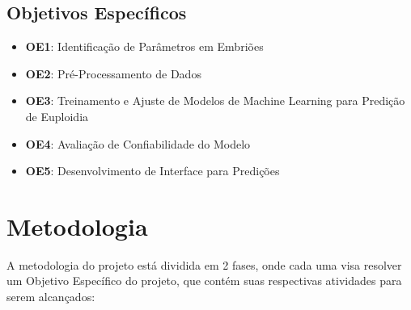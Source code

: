 \subsection{Objetivos Específicos}
\begin{itemize}
    \item \textbf{OE1}: Identificação de Parâmetros em Embriões
    \item \textbf{OE2}: Pré-Processamento de Dados
    \item \textbf{OE3}: Treinamento e Ajuste de Modelos de Machine Learning para Predição de Euploidia
    \item \textbf{OE4}: Avaliação de Confiabilidade do Modelo
    \item \textbf{OE5}: Desenvolvimento de Interface para Predições
\end{itemize}

\section{Metodologia}
A metodologia do projeto está dividida em 2 fases, onde cada uma visa resolver
um Objetivo Específico do projeto, que contém suas respectivas atividades para serem alcançados:

